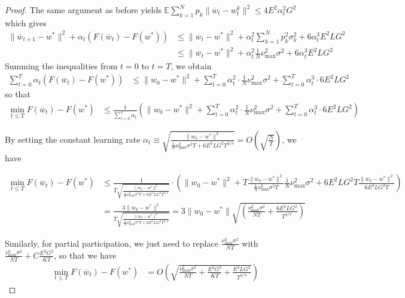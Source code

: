 \begin{proof}
The same argument as before yields $\mathbb{E}\sum_{k=1}^{N}p_{k}\|\overline{w}_{t}-w_{t}^{k}\|^{2}\leq4E^{2}\alpha_{t}^{2}G^{2}$
which gives 
\begin{align*}
\|\overline{w}_{t+1}-w^{\ast}\|^{2}+\alpha_{t}(F(\overline{w}_{t})-F(w^{\ast})) & \leq\|\overline{w}_{t}-w^{\ast}\|^{2}+\alpha_{t}^{2}\sum_{k=1}^{N}p_{k}^{2}\sigma_{k}^{2}+6\alpha_{t}^{3}E^{2}LG^{2}\\
& \leq\|\overline{w}_{t}-w^{\ast}\|^{2}+\alpha_{t}^{2}\frac{1}{N}\nu_{\max}^{2}\sigma^{2}+6\alpha_{t}^{3}E^{2}LG^{2}
\end{align*}
Summing the inequalities from $t=0$ to $t=T$, we obtain 
\begin{align*}
\sum_{t=0}^{T}\alpha_{t}(F(\overline{w}_{t})-F(w^{\ast})) & \leq\|w_{0}-w^{\ast}\|^{2}+\sum_{t=0}^{T}\alpha_{t}^{2}\cdot\frac{1}{N}\nu_{\max}^{2}\sigma^{2}+\sum_{t=0}^{T}\alpha_{t}^{3}\cdot6E^{2}LG^{2}
\end{align*}
so that
\begin{align*}
\min_{t\leq T}F(\overline{w}_{t})-F(w^{\ast}) & \leq\frac{1}{\sum_{t=0}^{T}\alpha_{t}}\left(\|w_{0}-w^{\ast}\|^{2}+\sum_{t=0}^{T}\alpha_{t}^{2}\cdot\frac{1}{N}\nu_{\max}^{2}\sigma^{2}+\sum_{t=0}^{T}\alpha_{t}^{3}\cdot6E^{2}LG^{2}\right)
\end{align*}

By setting the constant learning rate $\alpha_{t}\equiv\sqrt{\frac{\|w_{0}-w^{\ast}\|^{2}}{\frac{1}{N}\nu_{\max}^{2}\sigma^{2}T+6E^{2}LG^{2}T^{2/3}}}=O(\sqrt{\frac{N}{T}})$,
we have 

\begin{align*}
\min_{t\leq T}F(\overline{w}_{t})-F(w^{\ast}) & \leq\frac{1}{T\sqrt{\frac{\|w_{0}-w^{\ast}\|^{2}}{\frac{1}{N}\nu_{\max}^{2}\sigma^{2}T+6E^{2}LG^{2}T^{2/3}}}}\cdot\left(\|w_{0}-w^{\ast}\|^{2}+T\frac{\|w_{0}-w^{\ast}\|^{2}}{\frac{1}{N}\nu_{\max}^{2}\sigma^{2}T}\frac{1}{N}\nu_{\max}^{2}\sigma^{2}+6E^{2}LG^{2}T\frac{\|w_{0}-w^{\ast}\|^{2}}{6E^{2}LG^{2}T}\right)\\
& =\frac{3\|w_{0}-w^{\ast}\|^{2}}{T\sqrt{\frac{\|w_{0}-w^{\ast}\|^{2}}{\frac{1}{N}\nu_{\max}^{2}\sigma^{2}T+6E^{2}LG^{2}T^{2/3}}}}=3\|w_{0}-w^{\ast}\|\sqrt{(\frac{\nu_{\max}^{2}\sigma^{2}}{NT}+\frac{6E^{2}LG^{2}}{T^{4/3}})}
\end{align*}

Similarly, for partial participation, we just need to replace $\frac{\nu_{\max}^{2}\sigma^{2}}{NT}$
with $\frac{\nu_{\max}^{2}\sigma^{2}}{NT}+C\frac{E^{2}G^{2}}{KT}$,
so that we have 
\begin{align*}
\min_{t\leq T}F(\overline{w}_{t})-F(w^{\ast}) & =O(\sqrt{\frac{\nu_{\max}^{2}\sigma^{2}}{NT}+\frac{E^{2}G^{2}}{KT}+\frac{E^{2}LG^{2}}{T^{4/3}}})
\end{align*}
\end{proof}